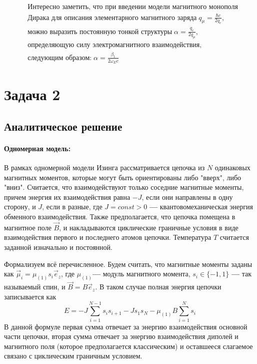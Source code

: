 \documentclass[oneside,final,14pt]{extarticle}
\begin{document}
	\vskip16pt
	\[
	\boxed{
		\begin{aligned}
			& \text{Интересно заметить, что при введении модели магнитного монополя} \\
			& \text{Дирака для описания элементарного магнитного заряда}\; q_{\mu} = \frac{\hbar c}{2q_{e}}, \\
			& \text{можно выразить постоянную тонкой структуры}\; \alpha = \frac{q_{e}}{2q_{\mu}}, \\
			& \text{определяющую силу электромагнитного взаимодействия,} \\
			& \text{следующим образом:}\; \alpha = \frac{\beta_{1}}{2 \omega_{E}c}
		\end{aligned}
	}
	\]
	\clearpage
	\section{Задача 2}
	\subsection{Аналитическое решение}
	\paragraph{Одномерная модель:}
	В рамках одномерной модели Изинга рассматривается цепочка из $N$ одинаковых магнитных моментов, которые могут быть ориентированы либо "вверх", либо "вниз". Считается, что взаимодействуют только соседние магнитные моменты, причем энергия их взаимодействия равна $-J$, если они направлены в одну сторону, и $J$, если в разные, где $J=const>0$ \textbf{---} квантовомеханическая энергия обменного взаимодействия. Также предполагается, что цепочка помещена в магнитное поле $\vec B$, и накладываются циклические граничные условия в виде взаимодействия первого и последнего атомов цепочки. Температура $T$ считается заданной изначально и постоянной. 

	Формализуем всё перечисленное. Будем считать, что магнитные моменты заданы как $\vec \mu_{i}=\mu_{(1)}s_{i}\vec e_{z}$, где $\mu_{(1)}$\textbf{---} модуль магнитного момента, $s_{i} \in \{-1, 1\}$ \textbf{---} так называемый спин, и $\vec B=B\vec e_{z}$. В таком случае полная энергия цепочки записывается как 
$$E=-J\sum_{i=1}^{N-1}s_{i}s_{i+1}-Js_{1}s_{N}-\mu_{(1)}B\sum_{i=1}^{N}s_{i}$$
	В данной формуле первая сумма отвечает за энергию взаимодействия основной части цепочки, вторая сумма отвечает за энергию взаимодействия диполей и магнитного поля (которое предполагается классическим) и оставшееся слагаемое связано с циклическим граничным условием. 
\end{document}
